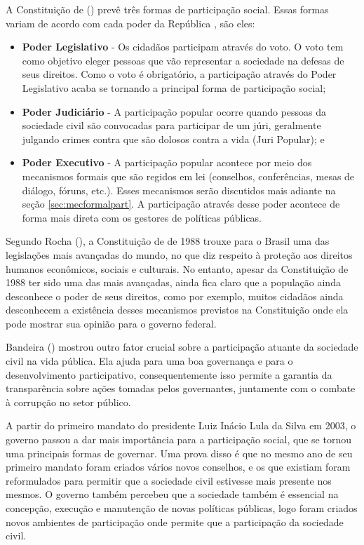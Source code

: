 A Constituição de (\citeyear{cf}) prevê três formas de participação social. Essas formas variam de acordo com cada poder da República \cite{mds2008participacao}, são eles:

\begin{itemize}
	\item \textbf{Poder Legislativo} - Os cidadãos participam através do voto. O voto tem como objetivo eleger pessoas que vão representar a sociedade na defesas de seus direitos. Como o voto é obrigatório, a participação através do Poder Legislativo acaba se tornando a principal forma de participação social;
	\item \textbf{Poder Judiciário} - A participação popular ocorre quando pessoas da sociedade civil são convocadas para participar de um júri, geralmente julgando crimes contra  que são dolosos contra a vida (Juri Popular); e
	\item \textbf{Poder Executivo} - A participação popular acontece por meio dos mecanismos formais que são regidos em lei (conselhos, conferências, mesas de diálogo, fóruns, etc.). Esses mecanismos serão discutidos mais adiante na seção \ref{sec:mecformalpart}. A participação através desse poder acontece de forma mais direta com os gestores de políticas públicas.
\end{itemize}

Segundo Rocha (\citeyear{rocha2008popular}), a Constituição de de 1988 trouxe para o Brasil uma das legislações mais avançadas do mundo, no que diz respeito à proteção aos direitos humanos econômicos, sociais e culturais. No entanto, apesar da Constituição de 1988 ter sido uma das mais avançadas, ainda fica claro que a população ainda desconhece o poder de seus direitos, como por exemplo, muitos cidadãos ainda desconhecem a existência desses mecanismos previstos na Constituição onde ela pode mostrar sua opinião para o governo federal.

Bandeira (\citeyear{bandeira1999articulacao}) mostrou outro fator crucial sobre a participação atuante da sociedade civil na vida pública. Ela ajuda para uma boa governança e para o desenvolvimento participativo, consequentemente isso permite a garantia da transparência sobre ações tomadas pelos governantes, juntamente com o combate à corrupção no setor público.

A partir do primeiro mandato do presidente Luiz Inácio Lula da Silva em 2003, o governo passou a dar mais importância para a participação social, que se tornou uma principais formas de governar. Uma prova disso é que no mesmo ano de seu primeiro mandato foram criados vários novos conselhos, e os que existiam foram reformulados para permitir que a sociedade civil estivesse mais presente nos mesmos. O governo também percebeu que a sociedade também é essencial na concepção, execução e manutenção de novas políticas públicas, logo foram criados novos ambientes de participação onde permite que a participação da sociedade civil.

